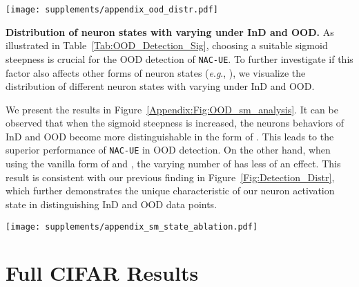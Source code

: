 \documentclass{article} \usepackage{iclr2024_conference,times}
\newcommand{\ie}{\textit{i}.\textit{e}.}
\newcommand{\eg}{\textit{e}.\textit{g}.}
\newcommand{\bfstart}[1]{\noindent\textbf{#1.}}
\begin{document}
\begin{figure*}[t]
	\centering \texttt{[image: supplements/appendix\_ood\_distr.pdf]} \caption{Ablation studies on the neuron activation states .  We visualize the distribution of averaged coverage scores \textit{w.r.t} all neurons (See Eq.(\ref{Eq:NAC-UE})) on the ImageNet benchmark.}
	\label{Appendix:Fig:OOD_Distr}
\end{figure*}



\bfstart{Distribution of neuron states with varying  under InD and OOD} 
As illustrated in Table~\ref{Tab:OOD_Detection_Sig}, choosing a suitable sigmoid steepness  is crucial for the OOD detection of \texttt{NAC-UE}. 
To further investigate if this factor also affects other forms of neuron states (\eg, ), we visualize the distribution of different neuron states with varying  under InD and OOD. 


We present the results in Figure~\ref{Appendix:Fig:OOD_sm_analysis}. It can be observed that when the sigmoid steepness  is increased, the neurons behaviors of InD and OOD become more distinguishable in the form of . This leads to the superior performance of \texttt{NAC-UE} in OOD detection. 
On the other hand, when using the vanilla form of  and , the varying number of  has less of an effect. 
This result is consistent with our previous finding in Figure~\ref{Fig:Detection_Distr}, which further demonstrates the unique characteristic of our neuron activation state  in distinguishing InD and OOD data points.










\begin{figure*}[t]
	\centering \texttt{[image: supplements/appendix\_sm\_state\_ablation.pdf]} \vspace{-2mm}
	\caption{Ablation studies on the form of neuron activation states with varying sigmoid steepness . We visualize InD and OOD distributions for the \textbf{layer4 unit-894} on ResNet-50. \texttt{NAC-UE} achieves best performance when  (using state ), which outperforms other forms of neuron states, \ie,  and .}
	\label{Appendix:Fig:OOD_sm_analysis}
\end{figure*}



\clearpage
\section{Full CIFAR Results}
\end{document}
